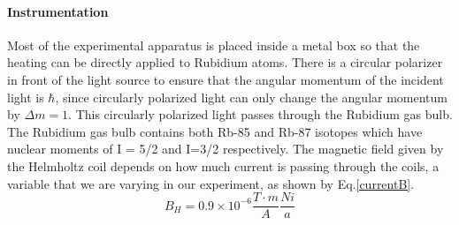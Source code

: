 \documentclass{sigchi}
\begin{document}
\paragraph{Instrumentation} Most of the experimental apparatus is placed inside a metal box so that the heating can be directly applied to Rubidium atoms. There is a circular  polarizer in front of the light source  to ensure that the angular momentum of the incident light is $\hbar$, since circularly polarized light can only change the angular momentum by $\Delta m = 1$. This circularly polarized light passes through the Rubidium gas bulb. The Rubidium gas bulb contains both Rb-85 and Rb-87 isotopes which have nuclear moments of I = 5/2 and I=3/2 respectively. 
The magnetic field given by the Helmholtz coil depends on how much current is passing through the coils, a variable that we are varying in our experiment, as shown by Eq.\ref{currentB}.
\begin{equation}\label{currentB}
B_{H} = 0.9\times 10^{-6} \frac{T\cdot m}{A} \frac{N i}{a}
\end{equation}
\end{document}

